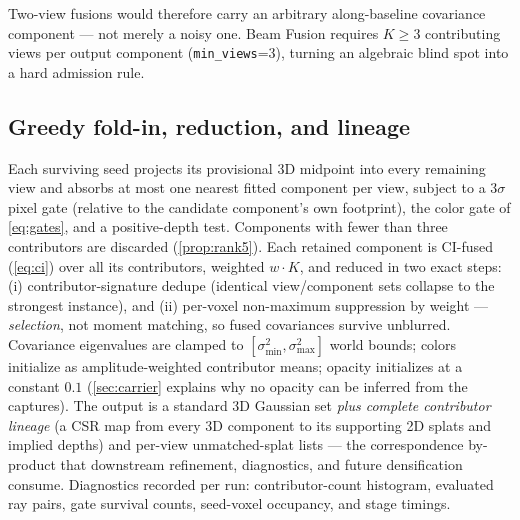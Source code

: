 Two-view fusions would therefore carry an arbitrary along-baseline covariance component ---
not merely a noisy one.  Beam Fusion requires $K \ge 3$ contributing views per output
component (\texttt{min\_views}=3), turning an algebraic blind spot into a hard admission
rule.

\subsection{Greedy fold-in, reduction, and lineage}
\label{sec:reduction}

Each surviving seed projects its provisional 3D midpoint into every remaining view and
absorbs at most one nearest fitted component per view, subject to a $3\sigma$ pixel gate
(relative to the candidate component's own footprint), the color gate of \cref{eq:gates},
and a positive-depth test.  Components with fewer than three contributors are discarded
(\cref{prop:rank5}).  Each retained component is CI-fused (\cref{eq:ci}) over all its
contributors, weighted $w \cdot K$, and reduced in two exact steps: (i) contributor-signature
dedupe (identical view/component sets collapse to the strongest instance), and (ii) per-voxel
non-maximum suppression by weight --- \emph{selection}, not moment matching, so fused
covariances survive unblurred.  Covariance eigenvalues are clamped to
$[\sigma_{\min}^2, \sigma_{\max}^2]$ world bounds; colors initialize as amplitude-weighted
contributor means; opacity initializes at a constant $0.1$ (\cref{sec:carrier} explains why
no opacity can be inferred from the captures).  The output is a standard 3D Gaussian set
\emph{plus complete contributor lineage} (a CSR map from every 3D component to its
supporting 2D splats and implied depths) and per-view unmatched-splat lists --- the
correspondence by-product that downstream refinement, diagnostics, and future densification
consume.  Diagnostics recorded per run: contributor-count histogram, evaluated ray pairs,
gate survival counts, seed-voxel occupancy, and stage timings.

\begin{figure}[t]
  \centering
  \caption{}
  \label{fig:beam-geometry}
\end{figure}

